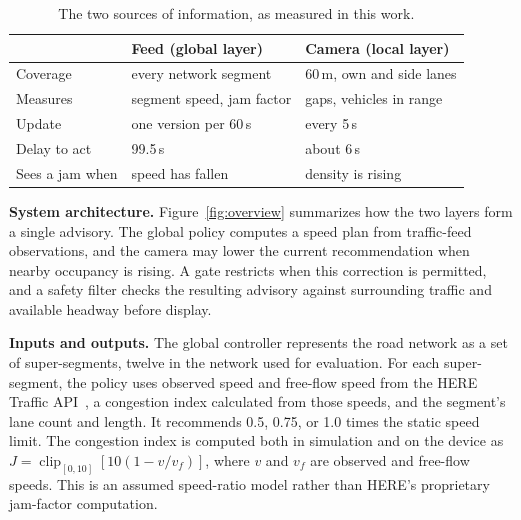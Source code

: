 \documentclass[letterpaper, 10pt, journal, twoside]{IEEEtran}
\begin{document}
\begin{table}[t]

\centering

\caption{The two sources of information, as measured in this work.}

\label{tab:sources}

\footnotesize

\setlength{\tabcolsep}{4pt}

\begin{tabular}{@{}lll@{}}

\toprule

 & Feed (global layer) & Camera (local layer) \\

\midrule

Coverage & every network segment & 60\,m, own and side lanes \\

Measures & segment speed, jam factor & gaps, vehicles in range \\

Update & one version per 60\,s & every 5\,s \\

Delay to act & 99.5\,s & about 6\,s \\

Sees a jam when & speed has fallen & density is rising \\

\bottomrule
\end{tabular}
\end{table}

\noindent\textbf{System architecture.} Figure~\ref{fig:overview} summarizes how the two layers form a single advisory. The global policy computes a speed plan from traffic-feed observations, and the camera may lower the current recommendation when nearby occupancy is rising. A gate restricts when this correction is permitted, and a safety filter checks the resulting advisory against surrounding traffic and available headway before display.

\noindent\textbf{Inputs and outputs.} The global controller represents the road network as a set of super-segments, twelve in the network used for evaluation. For each super-segment, the policy uses observed speed and free-flow speed from the HERE Traffic API~\cite{here_traffic_api}, a congestion index calculated from those speeds, and the segment's lane count and length. It recommends 0.5, 0.75, or 1.0 times the static speed limit. The congestion index is computed both in simulation and on the device as $J=\operatorname{clip}_{[0,10]}[10(1-v/v_f)]$, where $v$ and $v_f$ are observed and free-flow speeds. This is an assumed speed-ratio model rather than HERE's proprietary jam-factor computation.
\end{document}
